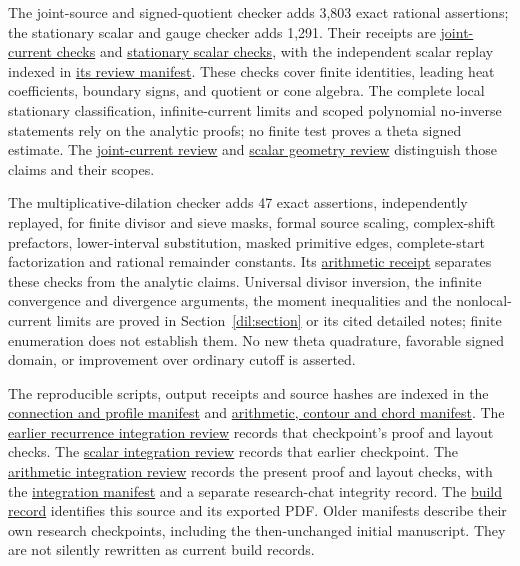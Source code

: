 \documentclass[11pt]{article}
\numberwithin{equation}{section}
\theoremstyle{definition}
\theoremstyle{remark}
\newcommand{\researchnote}[2]{\href{../../papers/investigations-2/active/22_theta_manifold_geometry/#1}{#2}}
\begin{document}
The joint-source and signed-quotient checker adds 3,803 exact rational
assertions; the stationary scalar and gauge checker adds 1,291.
Their receipts are
\researchnote{numerics/JOINT_SOURCE_CURRENT_CHECKS_20261015.json}
{joint-current checks} and
\researchnote{numerics/STATIONARY_SCALAR_GEOMETRY_CHECKS_20261015.json}
{stationary scalar checks}, with the independent scalar replay indexed in
\researchnote{numerics/SCALAR_STATIONARY_GEOMETRY_REVIEW_CHECKS_20261015.json}
{its review manifest}. These checks cover finite identities, leading heat
coefficients, boundary signs, and quotient or cone algebra. The complete
local stationary classification, infinite-current limits and scoped
polynomial no-inverse statements rely on the analytic proofs; no finite
test proves a theta signed estimate. The
\researchnote{reviews/10_JOINT_SOURCE_CURRENT_AND_SIGNED_QUOTIENT_REVIEW_20261015.md}
{joint-current review} and
\researchnote{reviews/11_SCALAR_STATIONARY_GEOMETRY_REVIEW_20261015.md}
{scalar geometry review} distinguish those claims and their scopes.

The multiplicative-dilation checker adds 47 exact assertions, independently
replayed, for finite divisor and sieve masks, formal source scaling,
complex-shift prefactors, lower-interval substitution, masked primitive
edges, complete-start factorization and rational remainder constants.
Its \researchnote{numerics/ARITHMETIC_DILATION_CHECKS_20261015.json}
{arithmetic receipt} separates these checks from the analytic claims.
Universal divisor inversion, the infinite convergence and divergence
arguments, the moment inequalities and the nonlocal-current limits are
proved in Section~\ref{dil:section} or its cited detailed notes; finite
enumeration does not establish them. No new theta quadrature, favorable
signed domain, or improvement over ordinary cutoff is asserted.

The reproducible scripts, output receipts and source hashes are indexed
in the \researchnote{numerics/CONNECTION_BRIDGE_AND_INNER_TURNING_CHECKS_20261015.json}
{connection and profile manifest} and
\researchnote{numerics/ARITHMETIC_CONTOUR_CHORD_CHECKS_20261015.json}
{arithmetic, contour and chord manifest}. The
\researchnote{reviews/09_RECURRENCE_MANUSCRIPT_INTEGRATION_REVIEW_20261015.md}
{earlier recurrence integration review} records that checkpoint's proof
and layout checks. The \researchnote{reviews/12_SCALAR_MANUSCRIPT_AND_TAIL_CONE_REVIEW_20261015.md}{scalar integration review}
records that earlier checkpoint. The
\researchnote{reviews/15_ARITHMETIC_MANUSCRIPT_INTEGRATION_REVIEW_20261015.md}{arithmetic integration review}
records the present proof and layout checks, with the
\researchnote{numerics/ARITHMETIC_MANUSCRIPT_INTEGRATION_CHECKS_20261015.json}{integration manifest}
and a separate research-chat integrity record. The
\researchnote{manuscript/BUILD_RECORD.json}{build record}
identifies this source and its exported PDF. Older manifests describe
their own research checkpoints, including the then-unchanged initial
manuscript. They are not silently rewritten as current build records.
\end{document}

